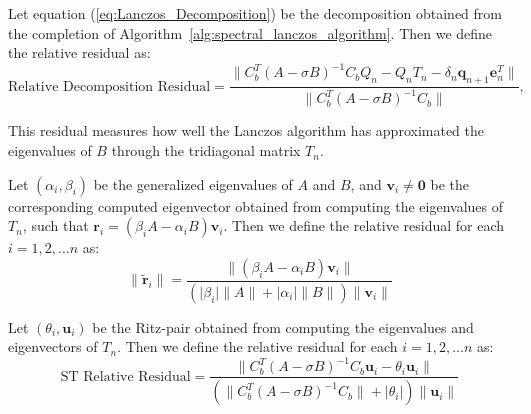 \begin{definition}\label{def:DecompositionResidual}
	Let equation (\ref{eq:Lanczos_Decomposition}) be the decomposition obtained from the completion of Algorithm~\ref{alg:spectral_lanczos_algorithm}. Then we define the relative residual as:
	\begin{equation}\label{eq:DecompositionResidual}
		\text{Relative Decomposition Residual} = \frac{\|C_b^T (A-\sigma B)^{-1} C_bQ_n - Q_nT_n - \delta_{n}\mathbf{q}_{n+1}\mathbf{e}_n^T\|}{\|C_b^T (A-\sigma B)^{-1} C_b\|},
	\end{equation}
\end{definition}
This residual measures how well the Lanczos algorithm has approximated the eigenvalues of $B$ through the tridiagonal matrix $T_n$.

\begin{definition}\label{def:GeneralizedRelativeResidual}
	Let $(\alpha_i, \beta_i)$ be the generalized eigenvalues of $A$ and $B$, and $\mathbf{v}_i \neq \mathbf{0}$ be the corresponding computed eigenvector obtained from computing the eigenvalues of $T_n$, such that $\mathbf{r}_i = (\beta_i A - \alpha_i B)\mathbf{v}_i$. Then we define the relative residual for each $i = 1, 2, \ldots n$ as:
	\begin{equation}\label{eq:GeneralizedResidual}
		\|\tilde{\mathbf{r}}_i\| = \frac{\| (\beta_i A - \alpha_i B)\mathbf{v}_i \| }{(\lvert \beta_i \rvert \|A\| + \lvert \alpha_i \rvert \|B\|)\|\mathbf{v}_i\| }
	\end{equation}
\end{definition}

\begin{definition}
\label{def:SpectralTransformedResidual}
	Let $(\theta_i, \mathbf{u}_i)$ be the Ritz-pair obtained from computing the eigenvalues and eigenvectors of $T_n$. Then we define the relative residual for each $i = 1, 2, \ldots n$ as:
	\begin{equation}\label{eq:STResidual}
		\text{ST Relative Residual} = \frac{\| C_b^T(A - \sigma B)^{-1}C_b \mathbf{u}_i - \theta_i \mathbf{u}_i \| }{( \| C_b^T(A - \sigma B)^{-1}C_b \| + \lvert \theta_i \rvert)\|\mathbf{u}_i\| }
	\end{equation}
\end{definition}

